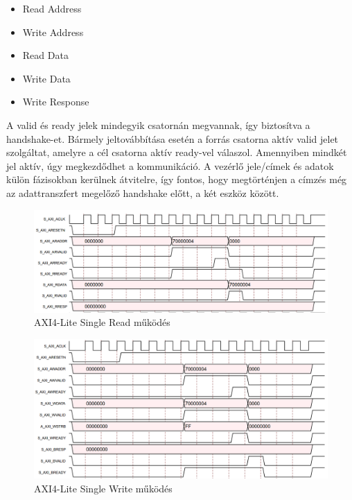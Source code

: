 \documentclass[a4paper,11pt]{article}
\begin{document}
\begin{itemize}
	\item Read Address
	\item Write Address
	\item Read Data
	\item Write Data
	\item Write Response
\end{itemize}
A valid és ready jelek mindegyik csatornán megvannak, így biztosítva a handshake-et. Bármely jeltovábbítása esetén a forrás csatorna aktív valid jelet szolgáltat, amelyre a cél csatorna aktív ready-vel válaszol. Amennyiben mindkét jel aktív, úgy megkezdődhet a kommunikáció. A vezérlő jele/címek és adatok külön fázisokban kerülnek átvitelre, így fontos, hogy megtörténjen a címzés még az adattranszfert megelőző handshake előtt, a két eszköz között.
\begin{figure}[H]
	\begin{center}
	\includegraphics[scale=1.6]{axi_single_read.png}
	\caption{AXI4-Lite Single Read működés}
	\label{fig:axi_single_read}
	\end{center}
\end{figure}
\begin{figure}[H]
	\begin{center}
	\includegraphics[scale=1.6]{axi_single_write.png}
	\caption{AXI4-Lite Single Write működés}
	\label{fig:axi_single_write}
	\end{center}
\end{figure}
\end{document}
